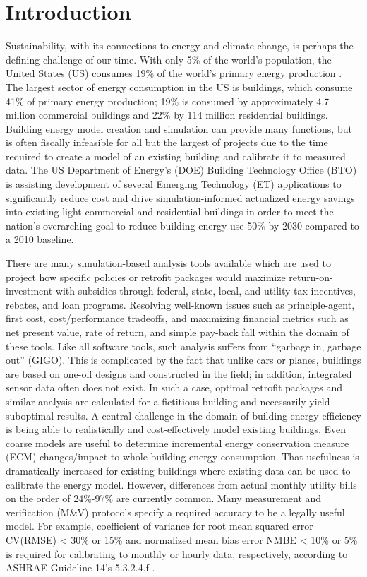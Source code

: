 \documentclass[preprint, review, 12pt]{elsarticle}
\begin{document}

\section{Introduction}
\label{sec:introduction}
Sustainability, with its connections to energy and climate change, is perhaps the defining challenge of our time. With only 5\% of the world’s population, the United States (US) consumes 19\% of the world’s primary energy production \cite{cit:doe2012a}. The largest sector of energy consumption in the US is buildings, which consume 41\% of primary energy production; 19\% is consumed by approximately 4.7 million commercial buildings and 22\% by 114 million residential buildings. Building energy model creation and simulation can provide many functions, but is often fiscally infeasible for all but the largest of projects due to the time required to create a model of an existing building and calibrate it to measured data. The US Department of Energy's (DOE) Building Technology Office (BTO) is assisting development of several Emerging Technology (ET) applications to significantly reduce cost and drive simulation-informed actualized energy savings into existing light commercial and residential buildings in order to meet the nation’s overarching goal to reduce building energy use 50\% by 2030 compared to a 2010 baseline.

There are many simulation-based analysis tools available which are used to project how specific policies or retrofit packages would maximize return-on-investment with subsidies through federal, state, local, and utility tax incentives, rebates, and loan programs. Resolving well-known issues such as principle-agent, first cost, cost/performance tradeoffs, and maximizing financial metrics such as net present value, rate of return, and simple pay-back fall within the domain of these tools. Like all software tools, such analysis suffers from ``garbage in, garbage out'' (GIGO). This is complicated by the fact that unlike cars or planes, buildings are based on one-off designs and constructed in the field; in addition, integrated sensor data often does not exist. In such a case, optimal retrofit packages and similar analysis are calculated for a fictitious building and necessarily yield suboptimal results. A central challenge in the domain of building energy efficiency is being able to realistically and cost-effectively model existing buildings. Even coarse models are useful to determine incremental energy conservation measure (ECM) changes/impact to whole-building energy consumption. That usefulness is dramatically increased for existing buildings where existing data can be used to calibrate the energy model. However, differences from actual monthly utility bills on the order of 24\%-97\% \cite{cit:earthadvantage2009,cit:roberts2012} are currently common. Many measurement and verification (M\&V) protocols specify a required accuracy to be a legally useful model. For example, coefficient of variance for root mean squared error CV(RMSE) < 30\% or 15\% and normalized mean bias error NMBE < 10\% or 5\% is required for calibrating to monthly or hourly data, respectively, according to ASHRAE Guideline 14's 5.3.2.4.f \cite{cit:ashrae2002}.
\end{document}
